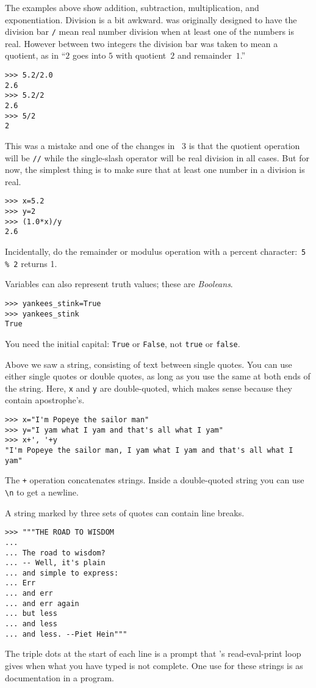 The examples above show addition, subtraction, multiplication, 
and exponentiation. 
Division is a bit awkward.
\python{} was originally designed to have the division bar
\lstinline[style=inline]!/! mean real number division 
when at least one of the numbers is real.
However between two integers the division bar was taken to mean 
a quotient, as in ``$2$ goes into $5$ with quotient~$2$ and remainder~$1$.''
\begin{lstlisting}[style=python]
>>> 5.2/2.0
2.6
>>> 5.2/2
2.6
>>> 5/2
2
\end{lstlisting}
This was a mistake and one of the changes in \python~3
is that the quotient operation will be \lstinline[style=inline]!//!
while the single-slash operator will be real division in all cases.
But for now, the simplest thing is to make sure that at least one
number in a division is real.
\begin{lstlisting}[style=python]
>>> x=5.2
>>> y=2
>>> (1.0*x)/y
2.6
\end{lstlisting}
Incidentally, do the remainder or modulus operation  
with a percent character:~\lstinline[style=inline]!5 % 2! returns 1.

Variables can also represent truth values; these are \textit{Booleans}.
\begin{lstlisting}[style=python]
>>> yankees_stink=True
>>> yankees_stink
True
\end{lstlisting}
You need the initial capital:
\lstinline[style=inline]!True!
or \lstinline[style=inline]!False!, not
\lstinline[style=inline]!true!
or \lstinline[style=inline]!false!.
 
Above we saw a string, consisting of text between single quotes.
You can use either single quotes or double quotes, as long as you use
the same at both ends of the string. 
Here, \lstinline[style=inline]!x! and \lstinline[style=inline]!y!
are double-quoted, which makes sense because they contain apostrophe's. 
\begin{lstlisting}[style=python]
>>> x="I'm Popeye the sailor man"
>>> y="I yam what I yam and that's all what I yam"
>>> x+', '+y
"I'm Popeye the sailor man, I yam what I yam and that's all what I yam"
\end{lstlisting}
The \lstinline[style=inline]!+! operation concatenates strings.
Inside a double-quoted string you can use \lstinline[style=inline]!\n! to
get a newline.

A string marked by three sets of quotes can contain line breaks.
\begin{lstlisting}[style=python]
>>> """THE ROAD TO WISDOM
... 
... The road to wisdom?
... -- Well, it's plain
... and simple to express:
... Err
... and err
... and err again
... but less
... and less
... and less. --Piet Hein"""
\end{lstlisting}
The triple dots at the start of each line is a prompt that \python's
read-eval-print loop gives when what you have typed is not complete.
One use for these strings is as documentation in a program.

